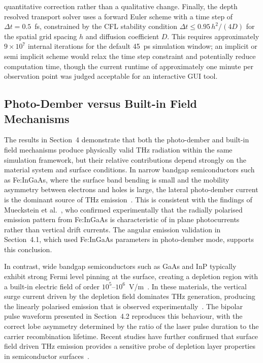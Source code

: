 \documentclass[12pt]{final_project_report}
\begin{document}
quantitative correction rather than a qualitative change. Finally, the depth resolved transport solver uses a forward Euler scheme with a time step of $\Delta t = 0.5$~fs, constrained by the CFL stability condition $\Delta t \leq 0.95\,h^2/(4D)$ for the spatial grid spacing $h$ and diffusion coefficient $D$. This requires approximately $9 \times 10^7$ internal iterations for the default 45~ps simulation window; an implicit or semi implicit scheme would relax the time step constraint and potentially reduce computation time, though the current runtime of approximately one minute per observation point was judged acceptable for an interactive GUI tool.

\subsection{Photo-Dember versus Built-in Field Mechanisms}
The results in Section~4 demonstrate that both the photo-dember and built-in field mechanisms produce physically valid THz radiation within the same simulation framework, but their relative contributions depend strongly on the material system and surface conditions. In narrow bandgap semiconductors such as Fe:InGaAs, where the surface band bending is small and the mobility asymmetry between electrons and holes is large, the lateral photo-dember current is the dominant source of THz emission~\cite{Klatt2010}. This is consistent with the findings of Mueckstein et al.~\cite{Mueckstein2015}, who confirmed experimentally that the radially polarised emission pattern from Fe:InGaAs is characteristic of in plane photocurrents rather than vertical drift currents. The angular emission validation in Section~4.1, which used Fe:InGaAs parameters in photo-dember mode, supports this conclusion.

In contrast, wide bandgap semiconductors such as GaAs and InP typically exhibit strong Fermi level pinning at the surface, creating a depletion region with a built-in electric field of order $10^5$--$10^6$~V/m~\cite{SimulationTHz}. In these materials, the vertical surge current driven by the depletion field dominates THz generation, producing the linearly polarised emission that is observed experimentally~\cite{auston_picosecond_1984}. The bipolar pulse waveform presented in Section~4.2 reproduces this behaviour, with the correct lobe asymmetry determined by the ratio of the laser pulse duration to the carrier recombination lifetime. Recent studies have further confirmed that surface field driven THz emission provides a sensitive probe of depletion layer properties in semiconductor surfaces~\cite{YangTonouchi2022}.
\end{document}
